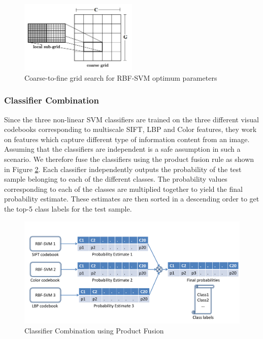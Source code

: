 \documentclass[12pt]{article}
\begin{document}
\begin{figure}
\centering
\includegraphics[width = 0.5\textwidth, height =0.2\textheight]{gridsearch}
\caption{Coarse-to-fine grid search for RBF-SVM optimum parameters}
\label{fig:gridsearch}
\end{figure}

\subsubsection{Classifier Combination}
Since the three non-linear SVM classifiers are trained on the three different visual codebooks corresponding to multiscale SIFT, LBP and Color features, they work on features which capture different type of information content from an image. Assuming that the classifiers are independent is a safe assumption in such a scenario. We therefore fuse the classifiers using the product fusion rule as shown in Figure \ref{fig:classifiercombination}. Each classifier independently outputs the probability of the test sample belonging to each of the different classes. The probability values corresponding to each of the classes are multiplied together to yield the final probability estimate. These estimates are then sorted in a descending order to get the top-5 class labels for the test sample.

\begin{figure}
\includegraphics[width = 1\textwidth]{classifiercombination}
\caption{Classifier Combination using Product Fusion}
\label{fig:classifiercombination}
\end{figure}
\end{document}
